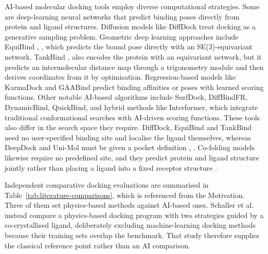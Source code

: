 AI-based molecular docking tools employ diverse computational strategies. Some are deep-learning neural networks that predict binding poses directly from protein and ligand structures. Diffusion models like DiffDock \cite{ref024} treat docking as a generative sampling problem. Geometric deep learning approaches include EquiBind \cite{ref009}, \cite{ref010}, which predicts the bound pose directly with an SE(3)-equivariant network. TankBind \cite{ref025}, \cite{ref026} also encodes the protein with an equivariant network, but it predicts an intermolecular distance map through a trigonometry module and then derives coordinates from it by optimisation. Regression-based models like KarmaDock \cite{ref027} and GAABind \cite{ref028} predict binding affinities or poses with learned scoring functions. Other notable AI-based algorithms include SurfDock, DiffBindFR, DynamicBind, QuickBind, and hybrid methods like Interformer, which integrate traditional conformational searches with AI-driven scoring functions. These tools also differ in the search space they require. DiffDock, EquiBind and TankBind need no user-specified binding site and localise the ligand themselves, whereas DeepDock and Uni-Mol must be given a pocket definition \cite{ref012}, \cite{ref035}. Co-folding models likewise require no predefined site, and they predict protein and ligand structure jointly rather than placing a ligand into a fixed receptor structure \cite{ref012}.

Independent comparative docking evaluations are summarised in Table~\ref{tab:literature-comparisons}, which is referenced from the Motivation. Three of them set physics-based methods against AI-based ones. Schaller et al. instead compare a physics-based docking program with two strategies guided by a co-crystallised ligand, deliberately excluding machine-learning docking methods because their training sets overlap the benchmark. That study therefore supplies the classical reference point rather than an AI comparison.

